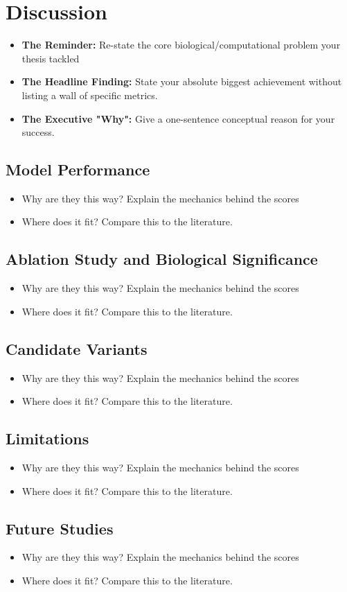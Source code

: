 
\graphicspath{{Figures/Discussion}}

\chapter{Discussion}\label{ch:discc}
\begin{itemize}
  \item \textbf{The Reminder:} Re-state the core biological/computational problem your thesis tackled
  \item \textbf{The Headline Finding:} State your absolute biggest achievement without listing a wall of specific metrics.
  \item \textbf{The Executive "Why":} Give a one-sentence conceptual reason for your success.
\end{itemize}

\section{Model Performance}
\begin{itemize}
  \item Why are they this way? Explain the mechanics behind the scores
  \item Where does it fit? Compare this to the literature.
\end{itemize}

\section{Ablation Study and Biological Significance}
\begin{itemize}
  \item Why are they this way? Explain the mechanics behind the scores
  \item Where does it fit? Compare this to the literature.
\end{itemize}

\section{Candidate Variants}
\begin{itemize}
  \item Why are they this way? Explain the mechanics behind the scores
  \item Where does it fit? Compare this to the literature.
\end{itemize}
\section{Limitations}
\begin{itemize}
  \item Why are they this way? Explain the mechanics behind the scores
  \item Where does it fit? Compare this to the literature.
\end{itemize}
\section{Future Studies}
\begin{itemize}
  \item Why are they this way? Explain the mechanics behind the scores
  \item Where does it fit? Compare this to the literature.
\end{itemize}
